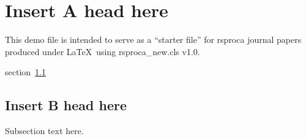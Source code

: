 \documentclass[openacc]{rsproca_new}%
\begin{document}
\begin{abstract}
Para 1 The abstract text goes here. The abstract text goes here. The abstract text goes here. The abstract text goes here.
The abstract text goes here. The abstract text goes here. The abstract text goes here. The abstract text goes here.
The abstract text goes here. The abstract text goes here. The abstract text goes here. The abstract text goes here.
The abstract text goes here. The abstract text goes here. The abstract text goes here. The abstract text goes here.

Para 2 The abstract text goes here. The abstract text goes here. The abstract text goes here. The abstract text goes here.
The abstract text goes here. The abstract text goes here. The abstract text goes here.\absbreak The abstract text goes here.
The abstract text goes here. The abstract text goes here. The abstract text goes here. The abstract text goes here.
The abstract text goes here. The abstract text goes here. The abstract text goes here. The abstract text goes here.

Para 3 The abstract text goes here. The abstract text goes here. The abstract text goes here. The abstract text goes here.
The abstract text goes here. The abstract text goes here. The abstract text goes here. The abstract text goes here.

Para 4 The abstract text goes here. The abstract text goes here. The abstract text goes here. The abstract text goes here.
The abstract text goes here. The abstract text goes here. The abstract text goes here. The abstract text goes here.
\end{abstract}

\rsbreak

\section{Insert A head here}

This demo file is intended to serve as a ``starter file''
for rsproca journal papers produced under \LaTeX\ using
rsproca\_new.cls v1.0.

section~\ref{sec1.1}

\subsection{Insert B head here}\label{sec1.1}
Subsection text here.
\end{document}

